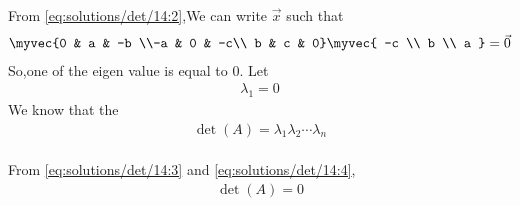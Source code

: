  From \eqref{eq:solutions/det/14:2},We can write $\vec{x}$ such that 
\begin{align}
\myvec{0 & a & -b \\-a & 0 & -c\\ b & c & 0}
\myvec{
   -c \\
   b \\
    a
    } =\vec{0} 
\end{align}    
So,one of the eigen value is equal to 0. Let
\begin{align} 
\lambda_1 =0 \label{eq:solutions/det/14:3}
\end{align}
We know that the
\begin{align}
\det(A) = \lambda_1 \lambda_2\cdots\lambda_n \label{eq:solutions/det/14:4}
\end{align} 
\\ From \eqref{eq:solutions/det/14:3} and  \eqref{eq:solutions/det/14:4},
\begin{align} 
\det(A)=0
\end{align}


